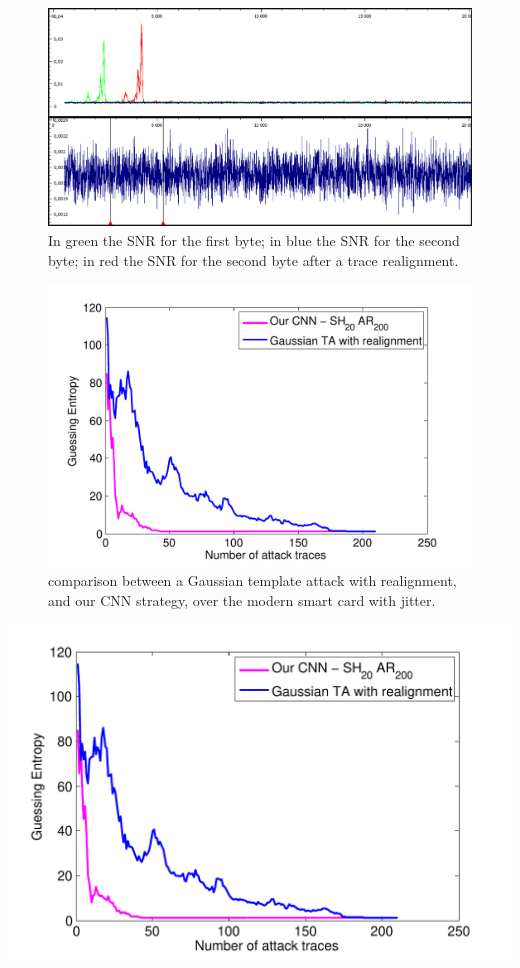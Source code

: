 \begin{figure}
    \centering
    \includegraphics[width=\textwidth]{../Figures/CHES2017/snrs.png} 
     \caption{In green the SNR for the first byte; in blue the SNR for the second byte; in red the SNR for the second byte after a trace realignment.}
\end{figure}


\begin{figure}
    \centering
    \includegraphics[width=\textwidth]{../Figures/CHES2017/TA_CNN_smartcard.pdf} 
     \caption{comparison between a Gaussian template attack with realignment, and our CNN strategy, over the modern smart card with jitter.}
\end{figure}


    \includegraphics[width=.45\textwidth]{../Figures/CHES2017/TA_CNN_smartcard.pdf} 
    \label{fig:SNR}

